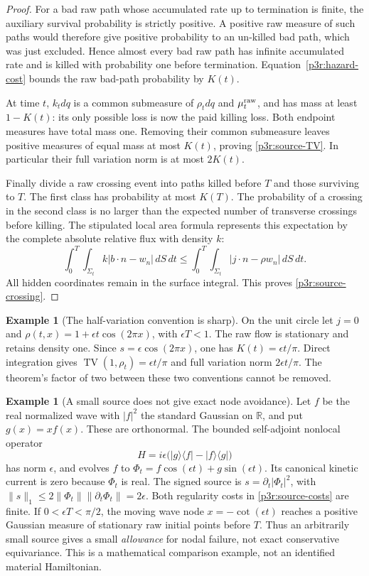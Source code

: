\documentclass[11pt]{article}
\numberwithin{equation}{section}
\theoremstyle{definition}
\newtheorem{example}[theorem]{Example}
\theoremstyle{remark}
\begin{document}
\begin{proof}
For a bad raw path whose accumulated rate up to termination is finite, the auxiliary survival probability is strictly positive. A positive raw measure of such paths would therefore give positive probability to an un-killed bad path, which was just excluded. Hence almost every bad raw path has infinite accumulated rate and is killed with probability one before termination. Equation~\eqref{p3r:hazard-cost} bounds the raw bad-path probability by $K(t)$.

At time $t$, $k_tdq$ is a common submeasure of $\rho_tdq$ and $\mu_t^{\rm raw}$, and has mass at least $1-K(t)$: its only possible loss is now the paid killing loss. Both endpoint measures have total mass one. Removing their common submeasure leaves positive measures of equal mass at most $K(t)$, proving \eqref{p3r:source-TV}. In particular their full variation norm is at most $2K(t)$.

Finally divide a raw crossing event into paths killed before $T$ and those surviving to $T$. The first class has probability at most $K(T)$. The probability of a crossing in the second class is no larger than the expected number of transverse crossings before killing. The stipulated local area formula represents this expectation by the complete absolute relative flux with density $k$:
\[
 \int_0^T\!\int_{\Sigma_t}k|b\cdot n-w_n|\,dS\,dt
 \le\int_0^T\!\int_{\Sigma_t}|j\cdot n-\rho w_n|\,dS\,dt.
\]
All hidden coordinates remain in the surface integral. This proves \eqref{p3r:source-crossing}.
\end{proof}

\begin{example}[The half-variation convention is sharp]\label{p3r:source-factor}
On the unit circle let $j=0$ and $\rho(t,x)=1+\epsilon t\cos(2\pi x)$, with $\epsilon T<1$. The raw flow is stationary and retains density one. Since $s=\epsilon\cos(2\pi x)$, one has $K(t)=\epsilon t/\pi$. Direct integration gives $\operatorname{TV}(1,\rho_t)=\epsilon t/\pi$ and full variation norm $2\epsilon t/\pi$. The theorem's factor of two between these two conventions cannot be removed.
\end{example}

\begin{example}[A small source does not give exact node avoidance]\label{p3r:source-node}
Let $f$ be the real normalized wave with $|f|^2$ the standard Gaussian on $\mathbb R$, and put $g(x)=xf(x)$. These are orthonormal. The bounded self-adjoint nonlocal operator
\[
 H=i\epsilon\bigl(|g\rangle\langle f|-|f\rangle\langle g|\bigr)
\]
has norm $\epsilon$, and evolves $f$ to $\Phi_t=f\cos(\epsilon t)+g\sin(\epsilon t)$. Its canonical kinetic current is zero because $\Phi_t$ is real. The signed source is $s=\partial_t|\Phi_t|^2$, with $\|s\|_1\le2\|\Phi_t\|\|\partial_t\Phi_t\|=2\epsilon$. Both regularity costs in \eqref{p3r:source-costs} are finite. If $0<\epsilon T<\pi/2$, the moving wave node $x=-\cot(\epsilon t)$ reaches a positive Gaussian measure of stationary raw initial points before $T$. Thus an arbitrarily small source gives a small \emph{allowance} for nodal failure, not exact conservative equivariance. This is a mathematical comparison example, not an identified material Hamiltonian.
\end{example}
\end{document}
